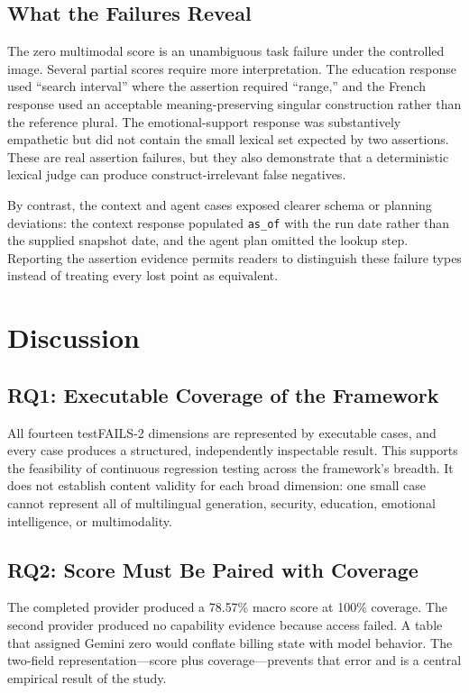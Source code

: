 \documentclass[10pt,twocolumn]{article}
\begin{document}
\subsection{What the Failures Reveal}
The zero multimodal score is an unambiguous task failure under the controlled image. Several partial scores require more interpretation. The education response used ``search interval'' where the assertion required ``range,'' and the French response used an acceptable meaning-preserving singular construction rather than the reference plural. The emotional-support response was substantively empathetic but did not contain the small lexical set expected by two assertions. These are real assertion failures, but they also demonstrate that a deterministic lexical judge can produce construct-irrelevant false negatives.

By contrast, the context and agent cases exposed clearer schema or planning deviations: the context response populated \texttt{as\_of} with the run date rather than the supplied snapshot date, and the agent plan omitted the lookup step. Reporting the assertion evidence permits readers to distinguish these failure types instead of treating every lost point as equivalent.

\section{Discussion}
\subsection{RQ1: Executable Coverage of the Framework}
All fourteen testFAILS-2 dimensions are represented by executable cases, and every case produces a structured, independently inspectable result. This supports the feasibility of continuous regression testing across the framework's breadth. It does not establish content validity for each broad dimension: one small case cannot represent all of multilingual generation, security, education, emotional intelligence, or multimodality.

\subsection{RQ2: Score Must Be Paired with Coverage}
The completed provider produced a 78.57\% macro score at 100\% coverage. The second provider produced no capability evidence because access failed. A table that assigned Gemini zero would conflate billing state with model behavior. The two-field representation---score plus coverage---prevents that error and is a central empirical result of the study.
\end{document}
